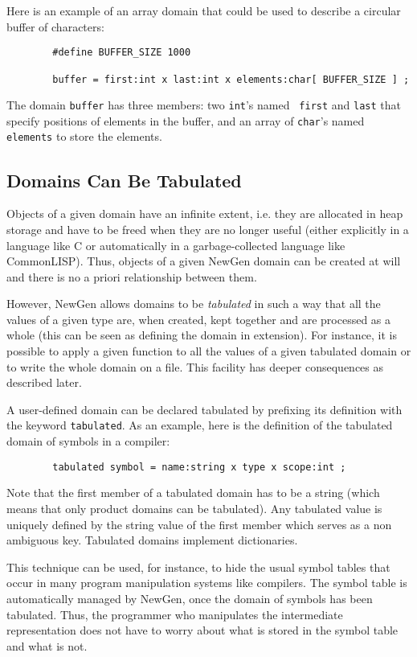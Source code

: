 Here is an example of an array domain that could be used to
describe a circular buffer of characters:
\begin{verbatim}
        #define BUFFER_SIZE 1000

        buffer = first:int x last:int x elements:char[ BUFFER_SIZE ] ;
\end{verbatim}
The domain {\tt buffer} has three members: two {\tt int}'s named {\tt
first} and {\tt last} that specify positions of elements in the buffer,
and an array of {\tt char}'s named {\tt elements} to store the elements.

\subsection{Domains Can Be Tabulated}

Objects of a given domain have an infinite extent, i.e. they are
allocated in heap storage and have to be freed when they are no longer
useful (either explicitly in a language like C or automatically in a
garbage-collected language like CommonLISP). Thus, objects of a given
NewGen domain can be created at will and there is no a priori
relationship between them.

However, NewGen allows domains to be {\em tabulated} in such a way that
all the values of a given type are, when created, kept together and are
processed as a whole (this can be seen as defining the domain in
extension).  For instance, it is possible to apply a given function to
all the values of a given tabulated domain or to write the whole domain
on a file. This facility has deeper consequences as described later.

A user-defined domain can be declared tabulated by prefixing its
definition with the keyword {\tt tabulated}. As an example, here is the
definition of the tabulated domain of symbols in a compiler:
\begin{verbatim}
        tabulated symbol = name:string x type x scope:int ;
\end{verbatim}
Note that the first member of a tabulated domain has to be a string
(which means that only product domains can be tabulated). Any tabulated
value is uniquely defined by the string value of the first member which
serves as a non ambiguous key. Tabulated domains implement
dictionaries. 

This technique can be used, for instance, to hide the usual symbol
tables that occur in many program manipulation systems like compilers.
The symbol table is automatically managed by NewGen, once the domain of
symbols has been tabulated. Thus, the programmer who manipulates the
intermediate representation does not have to worry about what is stored
in the symbol table and what is not.

